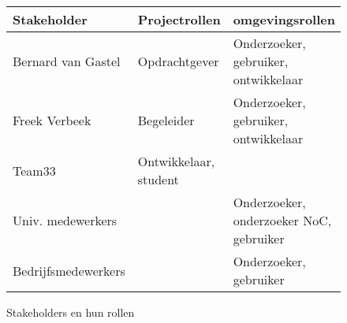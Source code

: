 \begin{figure}
{\tiny
\begin{center}
\begin{tabular}{lll}\hline
{\bf Stakeholder}    & {\bf Projectrollen}   & {\bf omgevingsrollen} \\\hline
Bernard van Gastel   & Opdrachtgever         & Onderzoeker, gebruiker, ontwikkelaar\\
Freek Verbeek        & Begeleider            & Onderzoeker, gebruiker, ontwikkelaar \\
Team33               & Ontwikkelaar, student & \\
Univ. medewerkers    &                       & Onderzoeker, onderzoeker NoC, gebruiker \\
Bedrijfsmedewerkers  &                       & Onderzoeker, gebruiker \\
\hline
\end{tabular}
\end{center}
}%
\caption{Stakeholders en hun rollen}\label{fig:stakeholders}
\end{figure}

